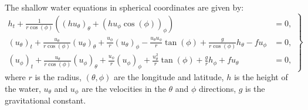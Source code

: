The shallow water equations in spherical coordinates are given by:
\begin{equation}
    \left.
    \begin{aligned}
        h_t + \frac{1}{r \cos (\phi)} \left( {(h u_\theta)}_{\theta} + {(h u_{\phi} \cos(\phi))}_{\phi}  \right) &= 0, \\
        {(u_{\theta})}_t  + \frac{u_\theta}{r \cos (\phi)} {(u_\theta)}_\theta + \frac{u_\phi}{r} {(u_\theta)}_{\phi}
        - \frac{u_\theta u_\phi }{r} \tan(\phi) + \frac{g}{r \cos (\phi)} h_\theta - f u_\phi &= 0, \\
        {(u_{\phi})}_t  + \frac{u_\theta}{r \cos (\phi)} {(u_\phi)}_\theta + \frac{u_\phi}{r} {(u_\phi)}_{\phi}
        + \frac{u_\theta^2}{r} \tan(\phi) + \frac{g}{r} h_\phi + f u_\theta &= 0,
    \end{aligned}
    \right\}
\end{equation}
where $r$ is the radius, $(\theta, \phi)$ are the longitude and latitude, $h$ is the height of the water, $u_\theta$ and $u_\phi$ are the velocities in the $\theta$ and $\phi$ directions, $g$ is the gravitational constant.



